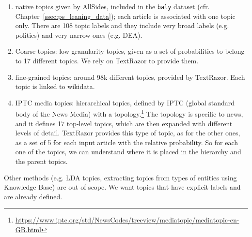 \begin{enumerate}
    \item native topics given by AllSides, included in the \texttt{baly} dataset (cfr. Chapter~\ref{ssec:ps_leaning_data}); each article is associated with one topic only. There are 108 topic labels and they include very broad labels (e.g. politics) and very narrow ones (e.g. DEA).
    \item Coarse topics: low-granularity topics, given as a set of probabilities to belong to 17 different topics. We rely on TextRazor to provide them.
    \item fine-grained topics: around 98k different topics, provided by TextRazor. Each topic is linked to wikidata.
    \item IPTC media topics: hierarchical topics, defined by IPTC (global standard body of the News Media) with a topology.\footnote{\url{https://www.iptc.org/std/NewsCodes/treeview/mediatopic/mediatopic-en-GB.html}}
    The topology is specific to news, and it defines 17 top-level topics, which are then expanded with different levels of detail. TextRazor provides this type of topic, as for the other ones, as a set of 5 for each input article with the relative probability. So for each one of the topics, we can understand where it is placed in the hierarchy and the parent topics.
\end{enumerate}



Other methods (e.g. LDA topics, extracting topics from types of entities using Knowledge Base) are out of scope. We want topics that have explicit labels and are already defined.

